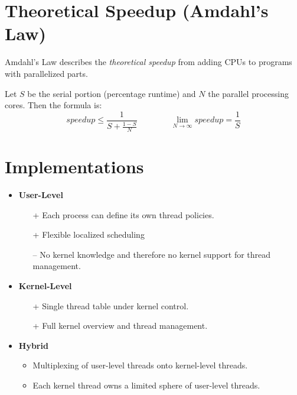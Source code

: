 	\section{Theoretical Speedup (Amdahl's Law)}
		Amdahl's Law describes the \textit{theoretical speedup} from adding CPUs to programs with parallelized parts.

		Let \(S\) be the serial portion (percentage runtime) and \(N\) the parallel processing cores. Then the formula is:
		\begin{equation*}
			\textit{speedup} \leq \frac{1}{S + \frac{1 - S}{N}} \qquad\qquad \lim\limits_{N \rightarrow \infty} \textit{speedup} = \frac{1}{S}
		\end{equation*}

	\section{Implementations}
		\begin{itemize}
			\item \textbf{User-Level}
				\begin{itemize}
					\item[+] Each process can define its own thread policies.
					\item[+] Flexible localized scheduling
					\item[--] No kernel knowledge and therefore no kernel support for thread management.
				\end{itemize}
			\item \textbf{Kernel-Level}
				\begin{itemize}
					\item[+] Single thread table under kernel control.
					\item[+] Full kernel overview and thread management.
				\end{itemize}
			\item \textbf{Hybrid}
				\begin{itemize}
					\item Multiplexing of user-level threads onto kernel-level threads.
					\item Each kernel thread owns a limited sphere of user-level threads.
				\end{itemize}
		\end{itemize}

